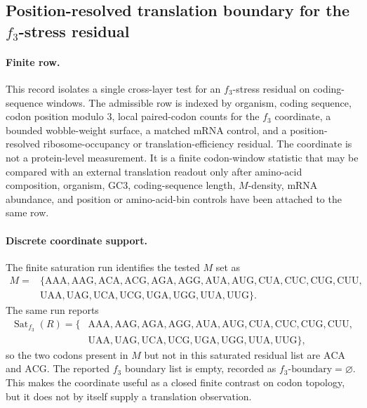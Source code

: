 \subsection{Position-resolved translation boundary for the $f_3$-stress residual}
\label{sec:q6-f3-stress-position-resolved-ribosome-occupancy-translation-boundary}

\paragraph{Finite row.}
This record isolates a single cross-layer test for an $f_3$-stress residual on coding-sequence windows.  The admissible row is indexed by organism, coding sequence, codon position modulo $3$, local paired-codon counts for the $f_3$ coordinate, a bounded wobble-weight surface, a matched mRNA control, and a position-resolved ribosome-occupancy or translation-efficiency residual.  The coordinate is not a protein-level measurement.  It is a finite codon-window statistic that may be compared with an external translation readout only after amino-acid composition, organism, GC3, coding-sequence length, $M$-density, mRNA abundance, and position or amino-acid-bin controls have been attached to the same row.

\paragraph{Discrete coordinate support.}
The finite saturation run identifies the tested $M$ set as
$$
\begin{aligned}
M={}&\{\mathrm{AAA},\mathrm{AAG},\mathrm{ACA},\mathrm{ACG},\mathrm{AGA},\mathrm{AGG},\mathrm{AUA},\mathrm{AUG},\mathrm{CUA},\mathrm{CUC},\mathrm{CUG},\mathrm{CUU},\\
&\mathrm{UAA},\mathrm{UAG},\mathrm{UCA},\mathrm{UCG},\mathrm{UGA},\mathrm{UGG},\mathrm{UUA},\mathrm{UUG}\}.
\end{aligned}
$$
The same run reports
$$
\begin{aligned}
\operatorname{Sat}_{f_3}(R)=\{&\mathrm{AAA},\mathrm{AAG},\mathrm{AGA},\mathrm{AGG},\mathrm{AUA},\mathrm{AUG},\mathrm{CUA},\mathrm{CUC},\mathrm{CUG},\mathrm{CUU},\\
&\mathrm{UAA},\mathrm{UAG},\mathrm{UCA},\mathrm{UCG},\mathrm{UGA},\mathrm{UGG},\mathrm{UUA},\mathrm{UUG}\},
\end{aligned}
$$
so the two codons present in $M$ but not in this saturated residual list are $\mathrm{ACA}$ and $\mathrm{ACG}$.  The reported $f_3$ boundary list is empty, recorded as $f_3\text{-boundary}=\varnothing$.  This makes the coordinate useful as a closed finite contrast on codon topology, but it does not by itself supply a translation observation.

